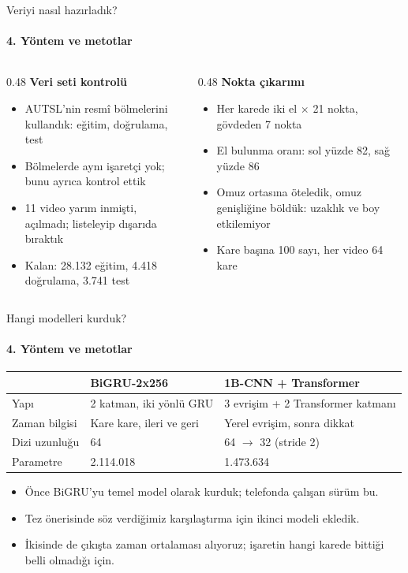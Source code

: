 \documentclass[aspectratio=169,11pt]{beamer}
\begin{document}
\begin{frame}{Veriyi nasıl hazırladık?}
\framesubtitle{4. Yöntem ve metotlar}
\begin{columns}[T]
\begin{column}{0.48\textwidth}
\textbf{Veri seti kontrolü}
\begin{itemize}
\item AUTSL'nin resmî bölmelerini kullandık: eğitim, doğrulama, test
\item Bölmelerde aynı işaretçi yok; bunu ayrıca kontrol ettik
\item 11 video yarım inmişti, açılmadı; listeleyip dışarıda bıraktık
\item Kalan: 28.132 eğitim, 4.418 doğrulama, 3.741 test
\end{itemize}
\end{column}
\begin{column}{0.48\textwidth}
\textbf{Nokta çıkarımı}
\begin{itemize}
\item Her karede iki el $\times$ 21 nokta, gövdeden 7 nokta
\item El bulunma oranı: sol yüzde 82, sağ yüzde 86
\item Omuz ortasına öteledik, omuz genişliğine böldük: uzaklık ve boy etkilemiyor
\item Kare başına 100 sayı, her video 64 kare
\end{itemize}
\end{column}
\end{columns}
\end{frame}

\begin{frame}{Hangi modelleri kurduk?}
\framesubtitle{4. Yöntem ve metotlar}
\centering
\begin{tabular}{@{}lll@{}}
\toprule
 & \textbf{BiGRU-2x256} & \textbf{1B-CNN + Transformer} \\
\midrule
Yapı & 2 katman, iki yönlü GRU & 3 evrişim + 2 Transformer katmanı \\
Zaman bilgisi & Kare kare, ileri ve geri & Yerel evrişim, sonra dikkat \\
Dizi uzunluğu & 64 & 64 $\rightarrow$ 32 (stride 2) \\
Parametre & 2.114.018 & 1.473.634 \\
\bottomrule
\end{tabular}

\vspace{5mm}
\begin{itemize}
\item Önce BiGRU'yu temel model olarak kurduk; telefonda çalışan sürüm bu.
\item Tez önerisinde söz verdiğimiz karşılaştırma için ikinci modeli ekledik.
\item İkisinde de çıkışta zaman ortalaması alıyoruz; işaretin hangi karede bittiği belli olmadığı için.
\end{itemize}
\end{frame}
\end{document}
